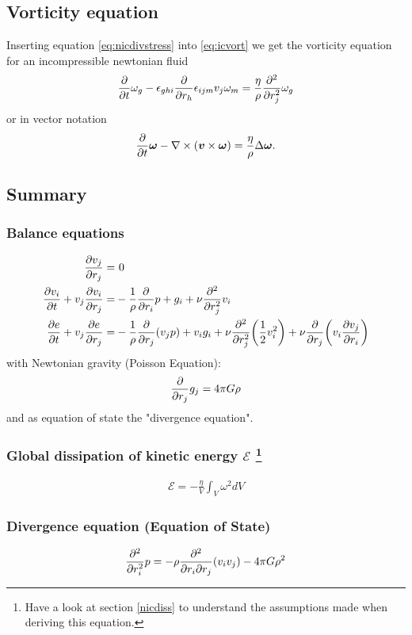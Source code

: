 \subsection{Vorticity equation}
Inserting equation \eqref{eq:nicdivstress} into \ref{eq:icvort}
we get the vorticity equation for an incompressible newtonian fluid
\begin{align}
\pd{t}\omega_g
-\epsilon_{ghi}\pd{r_h} \epsilon_{ijm} v_j \omega_m =
\frac{\eta}{\rho}\pdd{r_j}\omega_g
\end{align}
or in vector notation
\begin{align}
\pd{t} \vec{\omega}-\nabla \times (\vec{v} \times \vec{\omega}) = 
\frac{\eta}{\rho} \Delta \vec{\omega}.
\end{align}

\subsection{Summary}

\subsubsection*{Balance equations}
\begin{align}
\ppd{r_j}{v_j} =&\ 0\\
\ppd{t}{v_i} + v_j \ppd{r_j}{v_i} =& -\frac{1}{\rho}\pd{r_i}p + g_i
+\nu\pdd{r_j}v_i\\
\ppd{t}{e} + v_j \ppd{r_j}{e} =& -\frac{1}{\rho} \pd{r_j}(v_j p) + v_i g_i
+\nu \pdd{r_j}\lra{\frac{1}{2}v_i^2}+ \nu \pd{r_j}\lra{v_i\ppd{r_i}{v_j}}
\end{align}
with Newtonian gravity (Poisson Equation):
\begin{align}
\pd{r_j}g_j=4\pi G \rho
\end{align}
and as equation of state the "divergence equation".

\subsubsection*{Global dissipation of kinetic energy $\mathcal{E}$ 
\footnote{Have a look at section \ref{nicdiss} to understand the assumptions
made when deriving this equation.}}
\begin{align}
\mathcal{E} = -\frac{\eta}{V} \int_V  \omega^2 dV
\label{eq:nicdiss}
\end{align}

\subsubsection*{Divergence equation (Equation of State)}
\begin{align}
\pdd{r_i}p= 
-\rho \frac{\partial^2}{\partial r_i \partial r_j}(v_i v_j)
-4\pi G \rho^2
\end{align}

